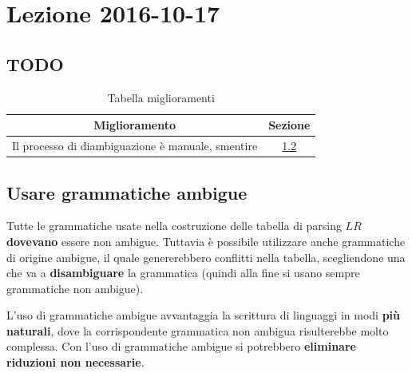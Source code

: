 \section{Lezione 2016-10-17}
\subsection{TODO}
\begin{table}[H]
\begin{center}
\begin{tabular}{|p{\textwidth}|c|}
\hline
\multicolumn{1}{|c|}{\textbf{Miglioramento}} & \textbf{Sezione} \\ \hline
Il processo di diambiguazione \`e manuale, smentire &
\ref{sec:use_ambiguos_grammar} \\ \hline
\end{tabular}
\end{center}
\caption{Tabella miglioramenti}
\label{tab:tab_todo}
\end{table}

\subsection{Usare grammatiche ambigue}
\label{sec:use_ambiguos_grammar}
Tutte le grammatiche usate nella costruzione delle tabella di parsing $LR$
\textbf{dovevano} essere non ambigue. Tuttavia \`e possibile utilizzare anche
grammatiche di origine ambigue, il quale genererebbero conflitti nella tabella,
scegliendone una che va a \textbf{disambiguare} la grammatica (quindi alla fine
si usano sempre grammatiche non ambigue).

L'uso di grammatiche ambigue avvantaggia la scrittura di linguaggi in modi
\textbf{pi\`u naturali}, dove la corrispondente grammatica non ambigua
risulterebbe molto complessa. Con l'uso di grammatiche ambigue si potrebbero
\textbf{eliminare riduzioni non necessarie}.

